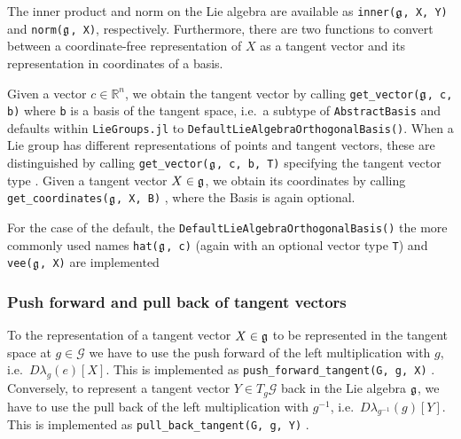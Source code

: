 \documentclass{juliacon}
\begin{document}
The inner product and norm on the Lie algebra are available as \verb|inner(|$\frak g$\verb|, X, Y)| and \verb|norm(|$\frak g$\verb|, X)|, respectively.
Furthermore, there are two functions to convert between a coordinate-free representation of $X$ as a tangent vector and its representation in coordinates of a basis.

Given a vector $c \in \mathbb R^n$, we obtain the tangent vector by calling \verb|get_vector(|$\frak g$\verb|, c, b)| where \verb|b| is a basis of the tangent space, i.e.\ a subtype of \verb|AbstractBasis| and defaults within \verb|LieGroups.jl| to \verb|DefaultLieAlgebraOrthogonalBasis()|.
When a Lie group has different representations of points and tangent vectors, these are distinguished by calling \verb|get_vector(|$\frak g$\verb|, c, b, T)| specifying the tangent vector type%
.
Given a tangent vector $X \in \frak g$, we obtain its coordinates by calling \verb|get_coordinates(|$\frak g$\verb|, X, B)|%
, where the Basis is again optional.

For the case of the default, the \verb|DefaultLieAlgebraOrthogonalBasis()| the more commonly used names \verb|hat(|$\frak g$\verb|, c)|
(again with an optional vector type \verb|T|) and \verb|vee(|$\frak g$\verb|, X)|
are implemented

\subsubsection*{Push forward and pull back of tangent vectors}
To the representation of a tangent vector $X \in \frak g$ to be represented in the tangent space at $g \in \mathcal G$ we have to use the push forward of the left multiplication with $g$, i.e.\ $D\lambda_g(e)[X]$. This is implemented as \verb|push_forward_tangent(G, g, X)|%
.
Conversely, to represent a tangent vector $Y \in T_g\mathcal G$ back in the Lie algebra $\frak g$, we have to use the pull back of the left multiplication with $g^{-1}$, i.e.\ $D\lambda_{g^{-1}}(g)[Y]$. This is implemented as \verb|pull_back_tangent(G, g, Y)|%
.
\end{document}
